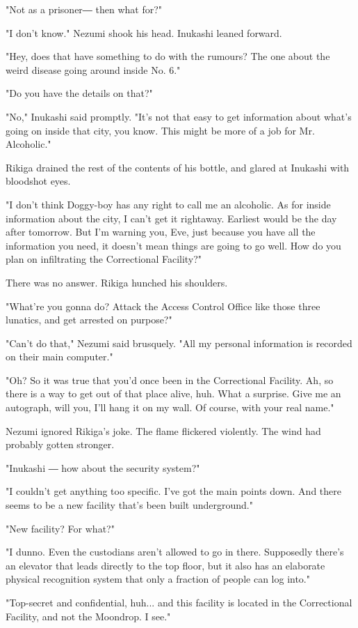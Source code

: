 "Not as a prisoner― then what for?"

"I don't know." Nezumi shook his head. Inukashi leaned forward.

"Hey, does that have something to do with the rumours? The one about the
weird disease going around inside No. 6."

"Do you have the details on that?"

"No," Inukashi said promptly. "It's not that easy to get information
about what's going on inside that city, you know. This might be more of
a job for Mr. Alcoholic."

Rikiga drained the rest of the contents of his bottle, and glared at
Inukashi with bloodshot eyes.

"I don't think Doggy-boy has any right to call me an alcoholic. As for
inside information about the city, I can't get it rightaway. Earliest
would be the day after tomorrow. But I'm warning you, Eve, just because
you have all the information you need, it doesn't mean things are going
to go well. How do you plan on infiltrating the Correctional Facility?"

There was no answer. Rikiga hunched his shoulders.

"What're you gonna do? Attack the Access Control Office like those three
lunatics, and get arrested on purpose?"

"Can't do that," Nezumi said brusquely. "All my personal information is
recorded on their main computer."

"Oh? So it was true that you'd once been in the Correctional Facility.
Ah, so there is a way to get out of that place alive, huh. What a
surprise. Give me an autograph, will you, I'll hang it on my wall. Of
course, with your real name."

Nezumi ignored Rikiga's joke. The flame flickered violently. The wind
had probably gotten stronger.

"Inukashi ― how about the security system?"

"I couldn't get anything too specific. I've got the main points down.
And there seems to be a new facility that's been built underground."

"New facility? For what?"

"I dunno. Even the custodians aren't allowed to go in there. Supposedly
there's an elevator that leads directly to the top floor, but it also
has an elaborate physical recognition system that only a fraction of
people can log into."

"Top-secret and confidential, huh... and this facility is located in the
Correctional Facility, and not the Moondrop. I see."

